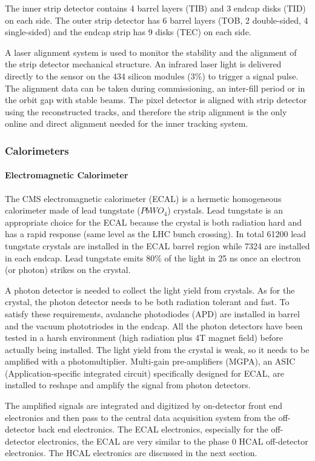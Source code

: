 The inner strip detector contains 4 barrel layers (TIB) and 3 endcap disks (TID) on each side. The outer strip detector has 6 barrel layers (TOB, 2 double-sided, 4 single-sided) and the endcap strip has 9 disks (TEC) on each side.

A laser alignment system\cite{Sirunyan:2017rbc} is used to monitor the stability and the alignment of the strip detector mechanical structure. An infrared laser light is delivered directly to the sensor on the 434 silicon modules (3\%) to trigger a signal pulse. The alignment data can be taken during commissioning, an inter-fill period or in the orbit gap with stable beams. The pixel detector is aligned with strip detector using the reconstructed tracks, and therefore the strip alignment is the only online and direct alignment needed for the inner tracking system. 

\subsubsection{Calorimeters}
\paragraph{Electromagnetic Calorimeter}
The CMS electromagnetic calorimeter (ECAL) is a hermetic homogeneous calorimeter made of lead tungstate ($PbWO_{4}$) crystals. Lead tungstate is an appropriate choice for the ECAL because the crystal is both radiation hard and has a rapid response (same level as the LHC bunch crossing). In total 61200 lead tungstate crystals are installed in the ECAL barrel region while 7324 are installed in each endcap. Lead tungstate emits 80\% of the light in 25 ns once an electron (or photon) strikes on the crystal.

A photon detector is needed to collect the light yield from crystals. As for the crystal, the photon detector needs to be both radiation tolerant and fast. To satisfy these requirements, avalanche photodiodes (APD) are installed in barrel and the vacuum phototriodes in the endcap. All the photon detectors have been tested in a harsh environment (high radiation plus 4T magnet field) before actually being installed. The light yield from the crystal is weak, so it needs to be amplified with a photomultiplier. Multi-gain pre-amplifiers (MGPA), an ASIC (Application-specific integrated circuit) specifically designed for ECAL, are installed to reshape and amplify the signal from photon detectors.

The amplified signals are integrated and digitized by on-detector front end electronics and then pass to the central data acquisition system from the off-detector back end electronics. The ECAL electronics, especially for the off-detector electronics, the ECAL are very similar to the phase 0 HCAL off-detector electronics. The HCAL electronics are discussed in the next section.

